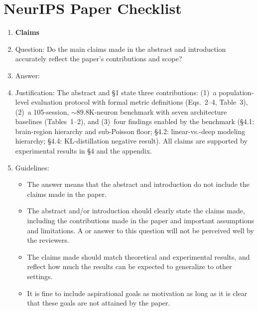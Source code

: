 \section*{NeurIPS Paper Checklist}


\begin{enumerate}

\item {\bf Claims}
    \item[] Question: Do the main claims made in the abstract and introduction accurately reflect the paper's contributions and scope?
    \item[] Answer: \answerYes{}
    \item[] Justification: The abstract and \S1 state three contributions:
      (1)~a population-level evaluation protocol with formal metric
      definitions (Eqs.~2--4, Table~3),
      (2)~a 105-session, ${\sim}89.8\text{K}$-neuron benchmark with seven
      architecture baselines (Tables~1--2), and
      (3)~four findings enabled by the benchmark (\S4.1: brain-region
      hierarchy and sub-Poisson floor; \S4.2: linear-vs.-deep
      modeling hierarchy; \S4.4: KL-distillation negative result).
      All claims are supported by experimental results in \S4 and
      the appendix.
    \item[] Guidelines:
    \begin{itemize}
        \item The answer \answerNA{} means that the abstract and introduction do not include the claims made in the paper.
        \item The abstract and/or introduction should clearly state the claims made, including the contributions made in the paper and important assumptions and limitations. A \answerNo{} or \answerNA{} answer to this question will not be perceived well by the reviewers. 
        \item The claims made should match theoretical and experimental results, and reflect how much the results can be expected to generalize to other settings. 
        \item It is fine to include aspirational goals as motivation as long as it is clear that these goals are not attained by the paper. 
    \end{itemize}


\end{enumerate}
